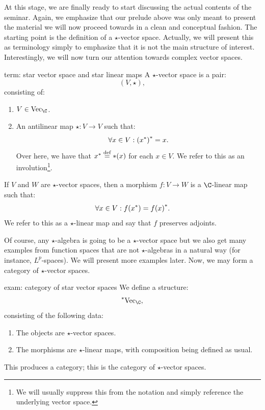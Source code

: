 \documentclass[main.tex]{subfiles}
\begin{document}
At this stage, we are finally ready to start discussing the actual contents of the seminar. Again, we emphasize that our prelude above was only meant to present the material we will now proceed towards in a clean and conceptual fashion. The starting point is the definition of a $\star$-vector space. Actually, we will present this as terminology simply to emphasize that it is not the main structure of interest. Interestingly, we will now turn our attention towards complex vector spaces. 

\begin{terminology}{}{term: star vector space and star linear maps}
A $\star$-vector space is a pair: 
\[(V,\star),\]    
consisting of:
\begin{enumerate}
    \item $V \in \Vect{\C}$.
    \item An antilinear map $\star: V \to V$ such that: 
    \[\forall x \in V: {({x}^{*})}^{*} = x.\]    
    Over here, we have that ${x}^{*} \stackrel{\text{def}}{=} *(x)$ for each $x \in V$. We refer to this as an involution\footnote{We will usually suppress this from the notation and simply reference the underlying vector space.}. 
\end{enumerate}
If $V$ and $W$ are $\star$-vector spaces, then a morphism $f: V \to W$ is a $\C$-linear map such that: 
\[\forall x \in V: f({x}^{*}) = {f(x)}^{*}.\]    
We refer to this as a $\star$-linear map and say that $f$ preserves adjoints. 
\end{terminology}

Of course, any $\star$-algebra is going to be a $\star$-vector space but we also get many examples from function spaces that are not $\star$-algebras in a natural way (for instance, $L^p$-spaces). We will present more examples later. Now, we may form a category of $\star$-vector spaces. 

\begin{example}{}{exam: category of star vector spaces}
We define a structure:
\[\StarVect,\]    
consisting of the following data: 
\begin{enumerate}
    \item The objects are $\star$-vector spaces. 
    \item The morphisms are $\star$-linear maps, with composition being defined as usual. 
\end{enumerate}
This produces a category; this is the category of $\star$-vector spaces. 
\end{example}
\end{document}
